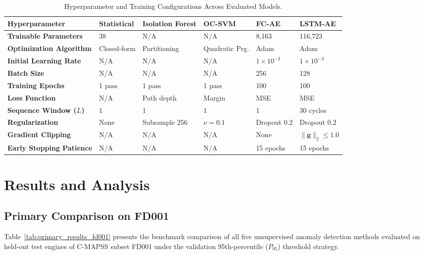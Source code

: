 \documentclass[12pt,a4paper,oneside]{report}
\begin{document}
\begin{table}[htbp]
    \centering
    \small
    \caption{Hyperparameter and Training Configurations Across Evaluated Models.}
    \label{tab:training_configs}
    \begin{tabularx}{\textwidth}{p{3.5cm}XXXXX}
        \toprule
        \textbf{Hyperparameter} & \textbf{Statistical} & \textbf{Isolation Forest} & \textbf{OC-SVM} & \textbf{FC-AE} & \textbf{LSTM-AE} \\
        \midrule
        \textbf{Trainable Parameters} & 38 & N/A & N/A & 8,163 & 116,723 \\
        \textbf{Optimization Algorithm} & Closed-form & Partitioning & Quadratic Prg. & Adam & Adam \\
        \textbf{Initial Learning Rate} & N/A & N/A & N/A & $1 \times 10^{-3}$ & $1 \times 10^{-3}$ \\
        \textbf{Batch Size} & N/A & N/A & N/A & 256 & 128 \\
        \textbf{Training Epochs} & 1 pass & 1 pass & 1 pass & 100 & 100 \\
        \textbf{Loss Function} & N/A & Path depth & Margin & MSE & MSE \\
        \textbf{Sequence Window ($L$)} & 1 & 1 & 1 & 1 & 30 cycles \\
        \textbf{Regularization} & None & Subsample 256 & $\nu = 0.1$ & Dropout 0.2 & Dropout 0.2 \\
        \textbf{Gradient Clipping} & N/A & N/A & N/A & None & $\|\mathbf{g}\|_2 \le 1.0$ \\
        \textbf{Early Stopping Patience}& N/A & N/A & N/A & 15 epochs & 15 epochs \\
        \bottomrule
    \end{tabularx}
\end{table}

\chapter{Results and Analysis}

\section{Primary Comparison on FD001}
Table~\ref{tab:primary_results_fd001} presents the benchmark comparison of all five unsupervised anomaly detection methods evaluated on held-out test engines of C-MAPSS subset FD001 under the validation 95th-percentile ($P_{95}$) threshold strategy.
\end{document}
